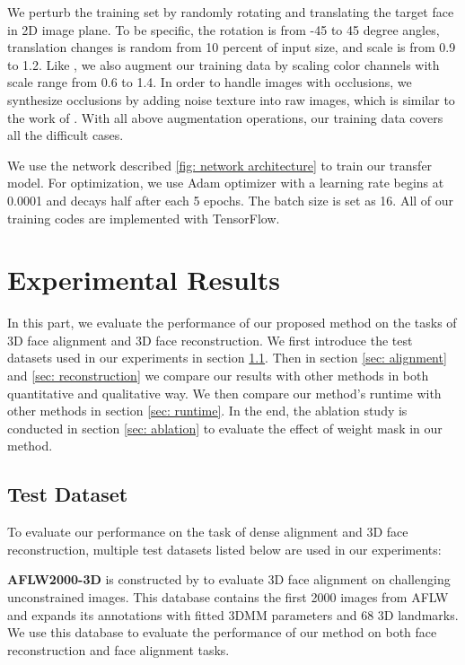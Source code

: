 \documentclass[runningheads]{llncs}
\begin{document}
We perturb the training set by randomly rotating and translating the target face in 2D image plane. To be specific, the rotation is from -45 to 45 degree angles, translation changes is random from 10 percent of input size, and scale is from 0.9 to 1.2. 
Like \cite{Jackson2017Large}, we also augment our training data by scaling color channels with scale range from 0.6 to 1.4.
In order to handle images with occlusions, we synthesize occlusions by adding noise texture into raw images, which is similar to the work of \cite{saito2016real,Yu2017Learning}. 
With all above augmentation operations, our training data covers all the difficult cases.


We use the network described \ref{fig: network architecture} to train our transfer model. For optimization,  we use Adam optimizer with a learning rate begins at 0.0001 and decays half after each 5 epochs. The batch size is set as 16. All of our training codes are implemented with TensorFlow\cite{abadi2016tensorflow}.

\section{Experimental Results}
\label{sec: exp}

In this part, we evaluate the performance of our proposed method on the tasks of 3D face alignment and 3D face reconstruction. 
We first introduce the test datasets used in our experiments in section \ref{test data}.
Then in section \ref{sec: alignment} and \ref{sec: reconstruction} we compare our results with other methods in both quantitative and qualitative way.
We then compare our method's runtime with other methods in section \ref{sec: runtime}.
In the end, the ablation study is conducted in section \ref{sec: ablation} to evaluate the effect of weight mask in our method.
 


\subsection{Test Dataset}
\label{test data}
To evaluate our performance on the task of dense alignment and 3D face reconstruction, multiple test datasets listed below are used in our experiments:

\textbf{AFLW2000-3D} 
is constructed by \cite{zhu2016face} to evaluate 3D face alignment on challenging unconstrained images. 
This database contains the first 2000 images from AFLW\cite{koestinger2011annotated} and expands its annotations with fitted 3DMM parameters and 68 3D landmarks. 
We use this database to evaluate the performance of our method on both face reconstruction and face alignment tasks.
\end{document}
